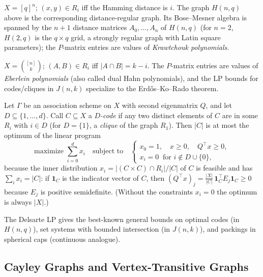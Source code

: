 \begin{example}
$X = [q]^n$; $(x, y) \in R_i$ iff the Hamming distance is $i$. The
graph $H(n, q)$ above is the corresponding distance-regular graph.
Its Bose--Mesner algebra is spanned by the $n + 1$ distance matrices
$A_0, \ldots, A_n$ of $H(n, q)$ (for $n = 2$, $H(2, q)$ is the
$q \times q$ grid, a strongly regular graph with Latin square
parameters); the $P$-matrix entries are values of \emph{Krawtchouk
polynomials}.
\end{example}

\begin{example}
$X = \binom{[n]}{k}$; $(A, B) \in R_i$ iff $|A \cap B| = k - i$. The
$P$-matrix entries are values of \emph{Eberlein polynomials} (also
called dual Hahn polynomials), and the
LP bounds for codes/cliques in $J(n, k)$ specialize to the
Erd\H{o}s--Ko--Rado theorem.
\end{example}

\begin{theorem}\label{thm:delsarte}
Let $\Gamma$ be an association scheme on $X$ with second eigenmatrix
$Q$, and let $D \subseteq \{1, \ldots, d\}$. Call $C \subseteq X$ a
\emph{$D$-code} if any two distinct elements of $C$ are in some $R_i$
with $i \in D$ (for $D = \{1\}$, a \emph{clique} of the graph $R_1$).
Then $|C|$ is at most the optimum of the linear program
\[
  \text{maximize } \sum_{i = 0}^{d} x_i
  \quad \text{subject to} \quad
  \begin{cases}
    x_0 = 1, \quad x \ge 0, \quad Q^\top x \ge 0, \\
    x_i = 0 \ \text{ for } i \notin D \cup \{0\},
  \end{cases}
\]
because the inner distribution $x_i = |(C \times C) \cap R_i| / |C|$ of
$C$ is feasible and has $\sum_i x_i = |C|$: if $\mathbf 1_C$ is the
indicator vector of $C$, then
$(Q^\top x)_j = \frac{|X|}{|C|}\, \mathbf 1_C^\top E_j \mathbf 1_C \ge 0$
because $E_j$ is positive semidefinite. (Without the constraints
$x_i = 0$ the optimum is always $|X|$.)
\end{theorem}

The Delsarte LP gives the best-known general bounds on optimal codes
(in $H(n, q)$), set systems with bounded intersection (in $J(n, k)$),
and packings in spherical caps (continuous analogue).

\subsection{Cayley Graphs and Vertex-Transitive Graphs}\label{subsec:cayley}

